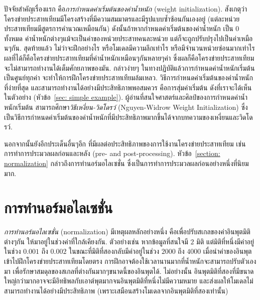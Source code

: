 ปัจจัยสำคัญเรื่องแรก คือ\textit{การกำหนดค่าเริ่มต้นของค่าน้ำหนัก} (weight initialization).  
สังเกตุว่าโครงข่ายประสาทเทียมมีโครงสร้างที่มีความสมมาตรและมีรูปแบบซ้ำซ้อนกันเองอยู่ (แต่ละหน่วยประสาทเทียมมีสูตรการคำนวณเหมือนกัน) 
ดังนั้นถ้าหากกำหนดค่าเริ่มต้นของค่าน้ำหนัก เป็น $0$ ทั้งหมด ค่าน้ำหนักต่างๆแม้จะเป็นค่าของหน่วยประสาทคนละหน่วย 
แต่ก็จะถูกปรับปรุงไปเป็นค่าเหมือนๆกัน.
สุดท้ายแล้ว ไม่ว่าจะฝึกอย่างไร หรือโมเดลมีความลึกเท่าไร หรือมีจำนวนหน่วยซ่อนมากเท่าไร ผลที่ได้ก็คือโครงข่ายประสาทเทียมที่ค่าน้ำหนักเหมือนๆกันหลายๆค่า 
ซึ่งผลก็คือโครงข่ายประสาทเทียมจะไม่สามารถทำงานได้เต็มศักยภาพของมัน.
กล่าวง่ายๆ ในทางปฏิบัติแล้วการกำหนดค่าน้ำหนักเริ่มต้นเป็นศูนย์ทุกค่า 
จะทำให้การฝึกโครงข่ายประสาทเทียมล้มเหลว.
วิธีการกำหนดค่าเริ่มต้นของค่าน้ำหนักที่ง่ายที่สุด และสามารถทำงานได้อย่างมีประสิทธิภาพพอสมควร 
คือการสุ่มค่าเริ่มต้น ดังที่เราจะได้เห็นในตัวอย่าง (หัวข้อ~\ref{sec: simple example}).
ผู้อ่านที่สนใจศาสตร์และศิลป์ของการกำหนดค่าน้ำหนักเริ่มต้น สามารถศึกษา\textit{วิธีเหงี่ยน-วิดโดรว์} (Nguyen-Widrow Weight Initialization)  ซึ่งเป็นวิธีการกำหนดค่าเริ่มต้นของค่าน้ำหนักที่มีประสิทธิภาพมากขึ้นได้จากบทความของเหงี่ยนและวิดโดรว์\cite{NguyenWidrow1990a}.

นอกจากนั้นยังอีกประเด็นอื่นๆอีก ที่มีผลต่อประสิทธิภาพของการใช้งานโครงข่ายประสาทเทียม เช่น การทำการประมวลผลก่อนและหลัง (pre- and post-processing).
หัวข้อ~\ref{section: normalization} กล่าวถึงการทำนอร์มอไลเซชั่น ซึ่งเป็นการทำการประมวลผลก่อนอย่างหนึ่งที่นิยมมาก.

\section*{การทำนอร์มอไลเซชั่น}
\label{section: normalization}

\textit{การทำนอร์มอไลเซชั่น} (normalization) มีเหตุผลหลักอย่างหนึ่ง 
คือเพื่อปรับสเกลของค่าอินพุตมิติต่างๆกัน ให้มาอยู่ในช่วงค่าที่ใกล้เคียงกัน.
ตัวอย่างเช่น หากข้อมูลที่สนใจมี $2$ มิติ 
แต่มิติที่หนึ่งมีค่าอยู่ในช่วง $0.001$ ถึง $0.002$ 
ในขณะที่มิติที่สองกลับมีค่าอยู่ในช่วง $2000$ ถึง $4000$ 
เมื่อนำค่าของอินพุตเข้าไปฝึกโครงข่ายประสาทเทียมโดยตรง 
การฝึกอาจต้องใช้เวลานานมากที่น้ำหนักจะสามารถปรับตัวเองมา
เพื่อรักษาสมดุลของสเกลที่ต่างกันมากๆขนาดนี้ของอินพุตได้.
ไม่อย่างนั้น อินพุตมิติที่สองที่มีขนาดใหญ่กว่ามากอาจจะมีอิทธิพลกับเอาต์พุตมากจนอินพุตมิติที่หนึ่งไม่มีความหมาย
และส่งผลให้โมเดลไม่สามารถทำงานได้อย่างมีประสิทธิภาพ (เพราะเสมือนสร้างโมเดลจากอินพุตมิติที่สองเท่านั้น)


